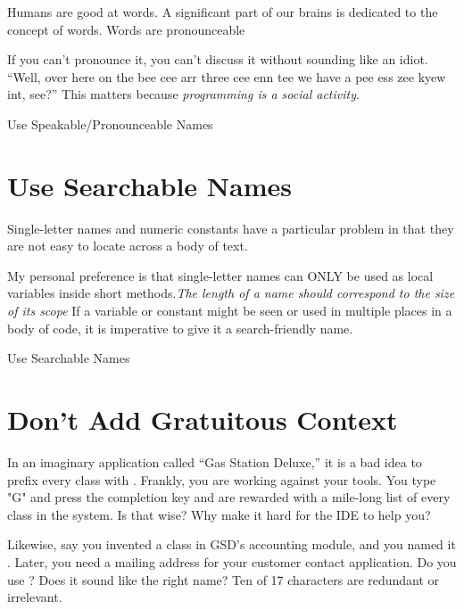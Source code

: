 \begin{remark}
Humans are good at words. A significant part of our brains is dedicated to the concept of words. Words are pronounceable
\end{remark}

If you can't pronounce it, you can't discuss it without sounding like an idiot. “Well, over here on the bee cee arr three cee enn tee we have a pee ess zee kyew int, see?” This matters because \textit{programming is a social activity}.

\begin{marker}
Use Speakable/Pronounceable Names
\end{marker}

\section{Use Searchable Names}

Single-letter names and numeric constants have a particular problem in that they are not easy to locate across a body of text.

My personal preference is that single-letter names can ONLY be used as local variables inside short methods.\textit{The length of a name should correspond to the size of its scope} If a variable or constant might be seen or used in multiple places in a body of code, it is imperative to give it a search-friendly name.

\begin{marker}
Use Searchable Names
\end{marker}

\section{Don’t Add Gratuitous Context}

In an imaginary application called “Gas Station Deluxe,” it is a bad idea to prefix every class with . Frankly, you are working against your tools. You type "G" and press the completion key and are rewarded with a mile-long list of every class in the system. Is that wise? Why make it hard for the IDE to help you?

Likewise, say you invented a  class in GSD’s accounting module, and you named it . Later, you need a mailing address for your customer contact application. Do you use ? Does it sound like the right name? Ten of 17 characters are redundant or irrelevant.

